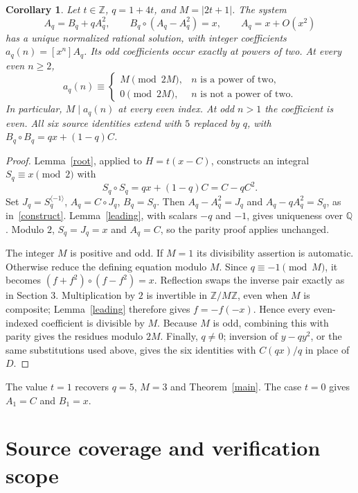 \documentclass[11pt]{article}
\newtheorem{corollary}{Corollary}
\newcommand{\Z}{\mathbb Z}
\newcommand{\Q}{\mathbb Q}
\begin{document}
\begin{corollary}\label{family}
Let $t\in\Z$, $q=1+4t$, and $M=|2t+1|$. The system
\[
 A_q=B_q+qA_q^2,\qquad B_q\circ(A_q-A_q^2)=x,
 \qquad A_q=x+O(x^2)
\]
has a unique normalized rational solution, with integer coefficients
$a_q(n)=[x^n]A_q$. Its odd coefficients occur exactly at powers of two.
At every even $n\geq2$,
\[
 a_q(n)\equiv
 \begin{cases}M\pmod{2M},&n\text{ is a power of two},\\
 0\pmod{2M},&n\text{ is not a power of two}.
 \end{cases}
\]
In particular, $M\mid a_q(n)$ at every even index. At odd $n>1$ the
coefficient is even. All six source identities extend with $5$ replaced
by $q$, with $B_q\circ B_q=qx+(1-q)C$.
\end{corollary}
\begin{proof}
Lemma~\ref{root}, applied to $H=t(x-C)$, constructs an integral
$S_q\equiv x\pmod2$ with
\[
 S_q\circ S_q=qx+(1-q)C=C-qC^2.
\]
Set $J_q=S_q^{\langle-1\rangle}$, $A_q=C\circ J_q$, $B_q=S_q$.
Then $A_q-A_q^2=J_q$ and $A_q-qA_q^2=S_q$, as in~\eqref{construct}.
Lemma~\ref{leading}, with scalars $-q$ and $-1$, gives uniqueness over $\Q$.
Modulo $2$, $S_q=J_q=x$ and $A_q=C$, so the parity proof applies unchanged.

The integer $M$ is positive and odd. If $M=1$ its divisibility assertion
is automatic. Otherwise reduce the defining equation modulo $M$.
Since $q\equiv-1\pmod M$, it becomes
$(f+f^2)\circ(f-f^2)=x$. Reflection swaps the inverse pair exactly as in
Section 3. Multiplication by $2$ is invertible in $\Z/M\Z$, even when
$M$ is composite; Lemma~\ref{leading} therefore gives $f=-f(-x)$.
Hence every even-indexed coefficient is divisible by $M$.
Because $M$ is odd, combining this with parity gives the residues modulo
$2M$. Finally, $q\ne0$; inversion of $y-qy^2$, or the same substitutions
used above, gives the six identities with $C(qx)/q$ in place of $D$.
\end{proof}

The value $t=1$ recovers $q=5$, $M=3$ and Theorem~\ref{main}.
The case $t=0$ gives $A_1=C$ and $B_1=x$.

\section{Source coverage and verification scope}\label{coverage}
\end{document}
